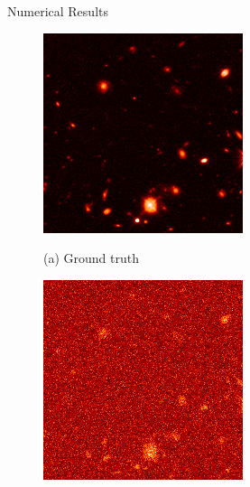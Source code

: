 \documentclass[final]{beamer}
\newlength{\colwidth}
\begin{document}
\begin{frame}[t]
\begin{columns}[t]
\begin{column}{\colwidth}
\begin{block}{Numerical Results}
    \begin{figure}[htb]
      \begin{minipage}[b]{.45\linewidth}
        \centering
        \centerline{\includegraphics[width=\textwidth]{figures/recon_clean.png}}
        \centerline{(a) Ground truth}\medskip
      \end{minipage}
      \hfill
      \begin{minipage}[b]{0.45\linewidth}
        \centering
        \centerline{\includegraphics[width=\textwidth]{figures/recon.png}}

\end{minipage}
\end{figure}
\end{block}
\end{column}
\end{columns}
\end{frame}
\end{document}
